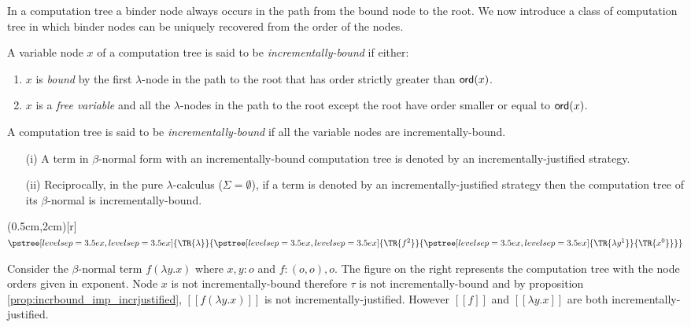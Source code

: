 \documentclass{llncs}
\newcommand\ord[1]{{\sf ord}(#1)}
\newcommand{\sem}[1]{{[\![ #1 ]\!]}}
\newcommand{\tree}[2][levelsep=3.5ex]{\pstree[levelsep=3.5ex,#1]{\TR{#2}}}
\begin{document}
In a computation tree a binder node always occurs in the path from
the bound node to the root. We now introduce a class of computation
tree in which binder nodes can be uniquely recovered from the order
of the nodes.
\begin{definition}
A variable node $x$ of a computation tree is said to be
\emph{incrementally-bound} if either:
\begin{enumerate}
\item $x$ is \emph{bound} by the first $\lambda$-node in the path to the root that has
order strictly greater than $\ord{x}$.
\item $x$ is a \emph{free variable} and all the $\lambda$-nodes in the path to the root except the root have order
smaller or equal to $\ord{x}$.
\end{enumerate}
A computation tree is said to be \emph{incrementally-bound} if all
the variable nodes are incrementally-bound.
\end{definition}


\begin{proposition}
\label{prop:incrbound_imp_incrjustified}
\begin{enumerate}
\item[(i)] A term in $\beta$-normal form with an incrementally-bound computation tree is denoted by an incrementally-justified strategy.
\item[(ii)] Reciprocally, in the pure $\lambda$-calculus ($\Sigma=\emptyset$), if a term is denoted by an incrementally-justified strategy then the computation tree of its $\beta$-normal is incrementally-bound.
\end{enumerate}
\end{proposition}

\parpic(0.5cm,2cm)[r]{ $\tree{\lambda}{\tree{f^2}{ \tree{\lambda y^1}{ \TR{x^0} }}}$ }
\begin{example}
Consider the $\beta$-normal term $f (\lambda y .x)$ where $x,y:o$ and $f:(o,o),o$. The figure on
the right represents the computation tree with the node orders given in exponent. 
Node $x$ is not incrementally-bound therefore $\tau$ is not incrementally-bound and
by proposition \ref{prop:incrbound_imp_incrjustified}, $\sem{f (\lambda
y .x)}$ is not incrementally-justified. 
However $\sem{f}$ and $\sem{\lambda y. x}$ are both incrementally-justified.
\end{example}
\end{document}
